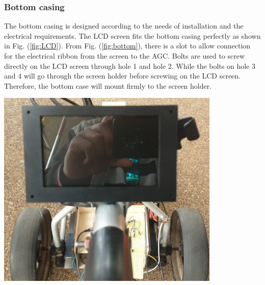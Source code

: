 \documentclass[11pt,landscape]{article}
\newenvironment{Figure}
  {\par\medskip\noindent\minipage{\linewidth}}
  {\endminipage\par\medskip}
\begin{document}
\begin{multicols}{3}
    
    \subsubsection{Bottom casing}
    The bottom casing is designed according to the needs of installation and the
    electrical requirements. The LCD screen fits the bottom casing perfectly as shown in
    Fig. (\ref{fig:LCD}). From Fig. (\ref{fig:bottom}), there is a slot to allow
    connection for the electrical ribbon from the screen to the AGC. Bolts are
    used to screw directly on the LCD screen through hole 1 and hole 2. While
    the bolts on hole 3 and 4 will go through the screen holder before screwing
    on the LCD screen. Therefore, the bottom case will mount firmly to the
    screen holder.
    
    \begin{Figure}
        \begin{center}
            \includegraphics[width=0.8\textwidth]{Figure32.jpg}
            \label{fig:LCD}
        \end{center}
    \end{Figure}
    

\end{multicols}
\end{document}
